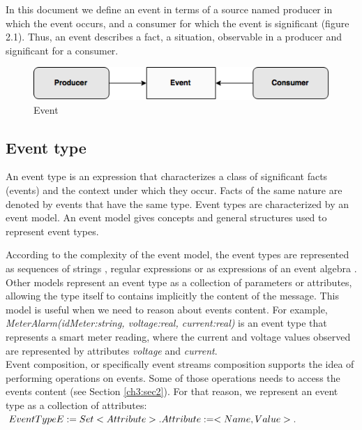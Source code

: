 In this document we define an event in terms of a source named producer in which the event occurs, and a consumer for which the event is significant (figure 2.1). Thus, an event describes a fact, a situation, observable in a producer and significant for a consumer.
\begin{figure}[H]
  \begin{center}
    \includegraphics[scale=0.65]{chap3/images/event.png}
  \end{center}
  \caption{Event}
  \label{fig:event}
\end{figure}
 \subsection{Event type}
 An event type is an expression that characterizes a class of significant facts (events) and the context under which they occur. Facts of the same nature are denoted by events that have the same type. Event types are characterized by an event model. An event model gives concepts and general structures used to represent event types.

According to the complexity of the event model, the event types are represented as sequences of strings \cite{Yuhara1994}, regular expressions \cite{Bailey1994} or as expressions of an event algebra \cite{Chakravarthy1994, Gatziu1994, Collet96}. Other models represent an event type as a collection of parameters or attributes, allowing the type itself to contains implicitly the content of the message. This model is useful when we need to reason about events content. For example, \textit{MeterAlarm(idMeter:string, voltage:real, current:real)} is an event type that represents a smart meter reading, where the current and voltage values observed are represented by attributes \textit{voltage} and \textit{current}.\\
Event composition, or specifically event streams composition supports the idea of performing operations on events. Some of those operations needs to access the events content (see Section \ref{ch3:sec2}). 
For that reason, we represent an event type as a collection of attributes:\\
$EventType E:= Set <Attribute>. \\
Attribute:= <Name, Value>.
$

